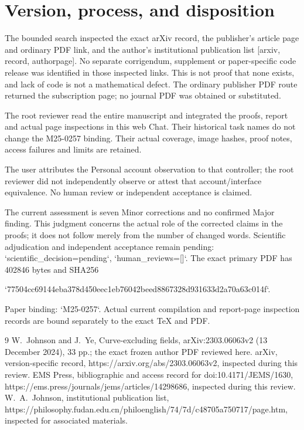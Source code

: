 \documentclass[10pt]{article}
\begin{document}
\section*{Version, process, and disposition}
The bounded search inspected the exact arXiv record, the publisher’s article page and ordinary PDF link, and the author’s institutional publication list [arxiv, record, authorpage]. No separate corrigendum, supplement or paper-specific code release was identified in those inspected links. This is not proof that none exists, and lack of code is not a mathematical defect. The ordinary publisher PDF route returned the subscription page; no journal PDF was obtained or substituted.\par
The root reviewer read the entire manuscript and integrated the proofs, report and actual page inspections in this web Chat. Their historical task names do not change the M25-0257 binding. Their actual coverage, image hashes, proof notes, access failures and limits are retained.\par
The user attributes the Personal account observation to that controller; the root reviewer did not independently observe or attest that account/interface equivalence. No human review or independent acceptance is claimed.\par
The current assessment is seven Minor corrections and no confirmed Major finding. This judgment concerns the actual role of the corrected claims in the proofs; it does not follow merely from the number of changed words. Scientific adjudication and independent acceptance remain pending: `scientific\_decision=pending`, `human\_reviews=[]`. The exact primary PDF has 402846 bytes and SHA256\par
`77504cc69144eba378d450eec1eb76042beed8867328d931633d2a70a63c014f`.\par
Paper binding: `M25-0257`. Actual current compilation and report-page inspection records are bound separately to the exact TeX and PDF.\par
9 W. Johnson and J. Ye, Curve-excluding fields, arXiv:2303.06063v2 (13 December 2024), 33 pp.; the exact frozen author PDF reviewed here. arXiv, version-specific record, https://arxiv.org/abs/2303.06063v2, inspected during this review. EMS Press, bibliographic and access record for doi:10.4171/JEMS/1630, https://ems.press/journals/jems/articles/14298686, inspected during this review. W. A. Johnson, institutional publication list, https://philosophy.fudan.edu.cn/philoenglish/74/7d/c48705a750717/page.htm, inspected for associated materials.\par
\end{document}
